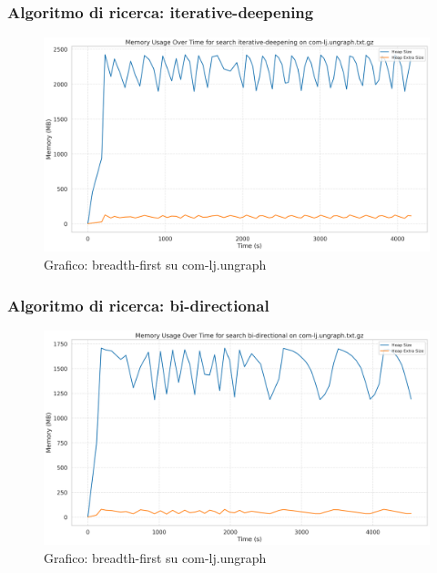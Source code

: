 \documentclass{article}
\begin{document}
\subsubsection{Algoritmo di ricerca: iterative-deepening}
\begin{figure}[h]\centering
	\includegraphics[width=\textwidth]{../plots/com-lj.ungraph_iterative-deepening.png}
	\caption{Grafico: breadth-first su com-lj.ungraph}
\end{figure}
\subsubsection{Algoritmo di ricerca: bi-directional}
\begin{figure}[h]\centering
	\includegraphics[width=\textwidth]{../plots/com-lj.ungraph_bi-directional.png}
	\caption{Grafico: breadth-first su com-lj.ungraph}
\end{figure}
\end{document}
